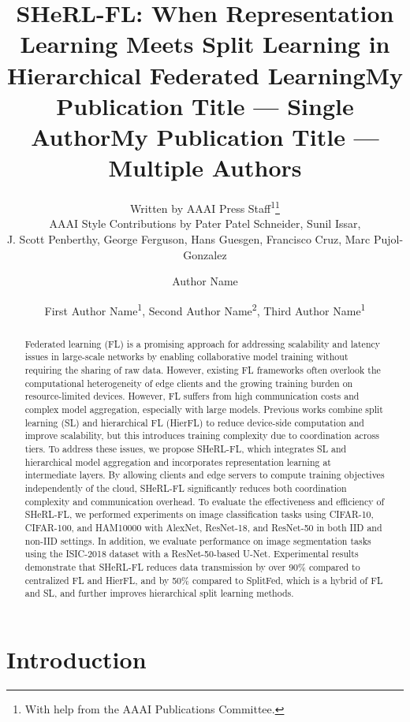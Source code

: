 \documentclass[letterpaper]{article} %
\title{SHeRL-FL: When Representation Learning Meets Split Learning in Hierarchical Federated Learning}
\author{
    Written by AAAI Press Staff\textsuperscript{\rm 1}\thanks{With help from the AAAI Publications Committee.}\\
    AAAI Style Contributions by Pater Patel Schneider,
    Sunil Issar,\\
    J. Scott Penberthy,
    George Ferguson,
    Hans Guesgen,
    Francisco Cruz\equalcontrib,
    Marc Pujol-Gonzalez\equalcontrib
}
\title{My Publication Title --- Single Author}
\author {
    Author Name
}
\title{My Publication Title --- Multiple Authors}
\author {
    First Author Name\textsuperscript{\rm 1},
    Second Author Name\textsuperscript{\rm 2},
    Third Author Name\textsuperscript{\rm 1}
}
\begin{document}
\maketitle

\begin{abstract}
    Federated learning (FL) is a promising approach for addressing scalability and latency issues in large-scale networks by enabling collaborative model training without requiring the sharing of raw data. However, existing FL frameworks often overlook the computational heterogeneity of edge clients and the growing training burden on resource-limited devices. However, FL suffers from high communication costs and complex model aggregation, especially with large models. Previous works combine split learning (SL) and hierarchical FL (HierFL) to reduce device-side computation and improve scalability, but this introduces training complexity due to coordination across tiers. To address these issues, we propose SHeRL-FL, which integrates SL and hierarchical model aggregation and incorporates representation learning at intermediate layers. By allowing clients and edge servers to compute training objectives independently of the cloud, SHeRL-FL significantly reduces both coordination complexity and communication overhead. To evaluate the effectiveness and efficiency of SHeRL-FL, we performed experiments on image classification tasks using CIFAR-10, CIFAR-100, and HAM10000 with AlexNet, ResNet-18, and ResNet-50 in both IID and non-IID settings. In addition, we evaluate performance on image segmentation tasks using the ISIC-2018 dataset with a ResNet-50-based U-Net. Experimental results demonstrate that SHeRL-FL reduces data transmission by over 90\% compared to centralized FL and HierFL, and by 50\% compared to SplitFed, which is a hybrid of FL and SL, and further improves hierarchical split learning methods. 
\end{abstract}


\section{Introduction}
\end{document}
